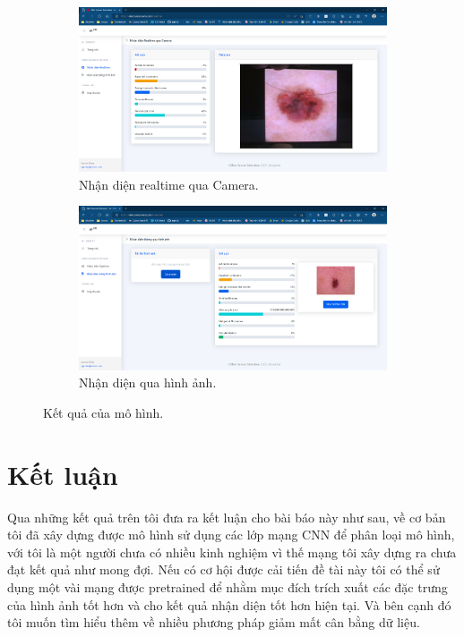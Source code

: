 \documentclass[12pt,a4paper]{article}
\begin{document}
	\begin{figure}[h!]
		\centering
		\begin{subfigure}[b]{0.4\linewidth}
			\includegraphics[width=\linewidth]{./images/web1.png}
			\caption{Nhận diện realtime qua Camera.}
		\end{subfigure}
		\begin{subfigure}[b]{0.4\linewidth}
			\includegraphics[width=\linewidth]{./images/web2.png}
			\caption{Nhận diện qua hình ảnh.}
		\end{subfigure}
		\caption{Kết quả của mô hình.}
		\label{fig:web2}
	\end{figure}
	
	\section{Kết luận}
	Qua những kết quả trên tôi đưa ra kết luận cho bài báo này như sau, về cơ bản tôi đã xây dựng được mô hình sử dụng các lớp mạng CNN để phân loại mô hình, với tôi là một người chưa có nhiều kinh nghiệm vì thế mạng tôi xây dựng ra chưa đạt kết quả như mong đợi. Nếu có cơ hội được cải tiến đề tài này tôi có thể sử dụng một vài mạng được pretrained để nhằm mục đích trích xuất các đặc trưng của hình ảnh tốt hơn và cho kết quả nhận diện tốt hơn hiện tại. Và bên cạnh đó tôi muốn tìm hiểu thêm về nhiều phương pháp giảm mất cân bằng dữ liệu.\\
	
\end{document}
